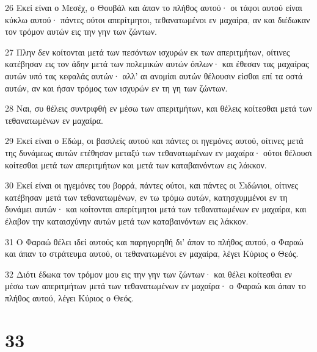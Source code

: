 \par 26 Εκεί είναι ο Μεσέχ, ο Θουβάλ και άπαν το πλήθος αυτού· οι τάφοι αυτού είναι κύκλω αυτού· πάντες ούτοι απερίτμητοι, τεθανατωμένοι εν μαχαίρα, αν και διέδωκαν τον τρόμον αυτών εις την γην των ζώντων.
\par 27 Πλην δεν κοίτονται μετά των πεσόντων ισχυρών εκ των απεριτμήτων, οίτινες κατέβησαν εις τον άδην μετά των πολεμικών αυτών όπλων· και έθεσαν τας μαχαίρας αυτών υπό τας κεφαλάς αυτών· αλλ' αι ανομίαι αυτών θέλουσιν είσθαι επί τα οστά αυτών, αν και ήσαν τρόμος των ισχυρών εν τη γη των ζώντων.
\par 28 Ναι, συ θέλεις συντριφθή εν μέσω των απεριτμήτων, και θέλεις κοίτεσθαι μετά των τεθανατωμένων εν μαχαίρα.
\par 29 Εκεί είναι ο Εδώμ, οι βασιλείς αυτού και πάντες οι ηγεμόνες αυτού, οίτινες μετά της δυνάμεως αυτών ετέθησαν μεταξύ των τεθανατωμένων εν μαχαίρα· ούτοι θέλουσι κοίτεσθαι μετά των απεριτμήτων και μετά των καταβαινόντων εις λάκκον.
\par 30 Εκεί είναι οι ηγεμόνες του βορρά, πάντες ούτοι, και πάντες οι Σιδώνιοι, οίτινες κατέβησαν μετά των τεθανατωμένων, εν τω τρόμω αυτών, κατησχυμμένοι εν τη δυνάμει αυτών· και κοίτονται απερίτμητοι μετά των τεθανατωμένων εν μαχαίρα, και έλαβον την καταισχύνην αυτών μετά των καταβαινόντων εις λάκκον.
\par 31 Ο Φαραώ θέλει ιδεί αυτούς και παρηγορηθή δι' άπαν το πλήθος αυτού, ο Φαραώ και άπαν το στράτευμα αυτού, οι τεθανατωμένοι εν μαχαίρα, λέγει Κύριος ο Θεός.
\par 32 Διότι έδωκα τον τρόμον μου εις την γην των ζώντων· και θέλει κοίτεσθαι εν μέσω των απεριτμήτων μετά των τεθανατωμένων εν μαχαίρα· ο Φαραώ και άπαν το πλήθος αυτού, λέγει Κύριος ο Θεός.

\chapter{33}

